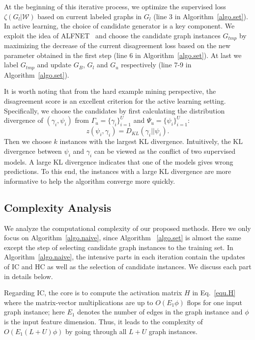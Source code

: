 \documentclass[sigconf]{acmart}
\newcommand{\eat}[1]{}
\begin{document}
At the beginning of this iterative process, we optimize the supervised loss $\zeta(G_l| \mathcal{W})$ based on current labeled graphs in $G_l$ (line 3 in Algorithm~\ref{algo.set}). In active learning, the choice of candidate generator is a key component.  We exploit the idea of ALFNET~\cite{bilgic2010active} and choose the candidate graph instances $G_{tmp}$ by maximizing the decrease of the current disagreement loss based on the new parameter obtained in the first step (line 6 in Algorithm~\ref{algo.set}).  At last we label $G_{tmp}$ and update $G_B$, $G_l$ and $G_u$ respectively (line 7-9 in Algorithm~\ref{algo.set}).  \eat{Since $\zeta(G_l^{t}| \mathcal{W}^{t}) \geq \zeta(G_l^{t}| \mathcal{W}^{t+1})$ and $\xi(G_u^{t}|\mathcal{W}^{t+1}) \geq \xi(G_u^{t+1}|\mathcal{W}^{t+1})$,  Algorithm~\ref{algo.set} can converge in finite steps.}

It is worth noting that from the hard example mining perspective, the disagreement score is an excellent criterion for the active learning setting. Specifically, we choose the candidates by first calculating the distribution divergence of $(\gamma_i,\psi_i)$ from $\Gamma_u = \{\gamma_i\}_{i=1}^U$ and $\Psi_u = \{\psi_i\}_{i=1}^U$:
\begin{equation}
  z(\psi_i,\gamma_i) = D_{KL}(\gamma_i || \psi_i).
\end{equation}
Then we choose $k$ instances with the largest KL divergence.  Intuitively, the KL divergence between $\psi_i$ and $\gamma_i$ can be viewed as the conflict of two supervised models.  A large KL divergence indicates that one of the models gives wrong predictions. To this end, the instances with a large KL divergence are more informative to help the algorithm converge more quickly.


\subsection{Complexity Analysis}
We analyze the computational complexity of our proposed methods.  Here we only focus on Algorithm~\ref{algo.naive}, since Algorithm ~\ref{algo.set} is almost the same except the step of selecting candidate graph instances to the training set.  In Algorithm~\ref{algo.naive}, the intensive parts in each iteration contain the updates of IC and HC as well as the selection of candidate instances. We discuss each part in details below.

Regarding IC, the core is to compute the activation matrix $H$ in Eq.~\eqref{equ.H} where the matrix-vector multiplications are up to $O(E_1\phi)$ flops for one input graph instance; here $E_1$ denotes the number of edges in the graph instance and $\phi$ is the input feature dimension.  Thus, it leads to the complexity of $O(E_1(L+U)\phi)$ by going through all $L+U$ graph instances.
\end{document}

